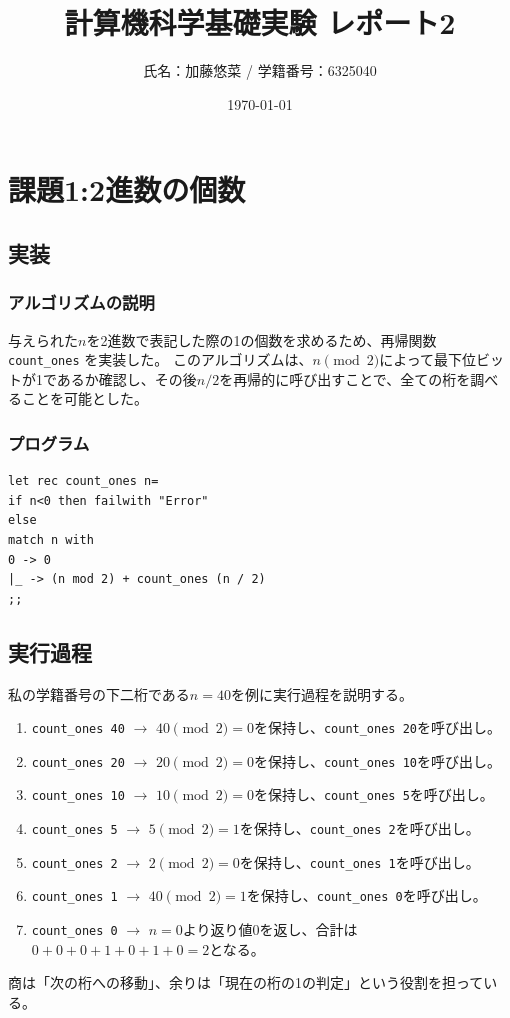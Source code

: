 \documentclass[titlepage]{ltjsarticle}
\title{計算機科学基礎実験 レポート2}
\author{氏名：加藤悠菜 / 学籍番号：6325040}
\date{\today}
\begin{document}
\maketitle

\section{課題1:2進数の個数}
\subsection{実装}
\subsubsection{アルゴリズムの説明}
与えられた$n$を2進数で表記した際の1の個数を求めるため、再帰関数 \texttt{count\_ones} を実装した。
このアルゴリズムは、$n \pmod 2 $によって最下位ビットが1であるか確認し、その後$n/2$を再帰的に呼び出すことで、全ての桁を調べることを可能とした。

\subsubsection{プログラム}
\begin{verbatim}
let rec count_ones n=
if n<0 then failwith "Error"
else
match n with
0 -> 0
|_ -> (n mod 2) + count_ones (n / 2)
;;
\end{verbatim}

\subsection{実行過程}
私の学籍番号の下二桁である$n=40$を例に実行過程を説明する。
\begin{enumerate}
    \item \texttt{count\_ones 40} $\rightarrow$ $40 \pmod 2 = 0$を保持し、\texttt{count\_ones 20}を呼び出し。
    \item \texttt{count\_ones 20} $\rightarrow$ $20 \pmod 2 = 0$を保持し、\texttt{count\_ones 10}を呼び出し。
    \item \texttt{count\_ones 10} $\rightarrow$ $10 \pmod 2 = 0$を保持し、\texttt{count\_ones 5}を呼び出し。
    \item \texttt{count\_ones 5} $\rightarrow$ $5 \pmod 2 = 1$を保持し、\texttt{count\_ones 2}を呼び出し。
    \item \texttt{count\_ones 2} $\rightarrow$ $2 \pmod 2 = 0$を保持し、\texttt{count\_ones 1}を呼び出し。
    \item \texttt{count\_ones 1} $\rightarrow$ $40 \pmod 2 = 1$を保持し、\texttt{count\_ones 0}を呼び出し。
    \item \texttt{count\_ones 0} $\rightarrow$ $n=0$より返り値$0$を返し、合計は$0+0+0+1+0+1+0=2$となる。
\end{enumerate}
商は「次の桁への移動」、余りは「現在の桁の1の判定」という役割を担っている。
\end{document}
